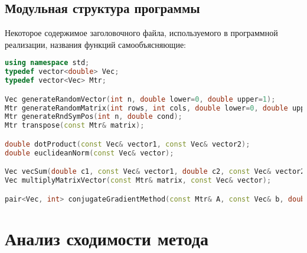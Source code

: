 \subsection{Модульная структура программы}
Некоторое содержимое заголовочного файла, используемого в программной реализации, названия функций самообъясняющие:
\begin{lstlisting}[language=c++]
using namespace std;
typedef vector<double> Vec;
typedef vector<Vec> Mtr;

Vec generateRandomVector(int n, double lower=0, double upper=1);
Mtr generateRandomMatrix(int rows, int cols, double lower=0, double upper=1);
Mtr generateRndSymPos(int n, double cond);
Mtr transpose(const Mtr& matrix);

double dotProduct(const Vec& vector1, const Vec& vector2);
double euclideanNorm(const Vec& vector);

Vec vecSum(double c1, const Vec& vector1, double c2, const Vec& vector2); // c1*vector1 + c2*vector2
Vec multiplyMatrixVector(const Mtr& matrix, const Vec& vector);

pair<Vec, int> conjugateGradientMethod(const Mtr& A, const Vec& b, double eps, int maxIter);
\end{lstlisting}

\clearpage
\section{Анализ сходимости метода}
